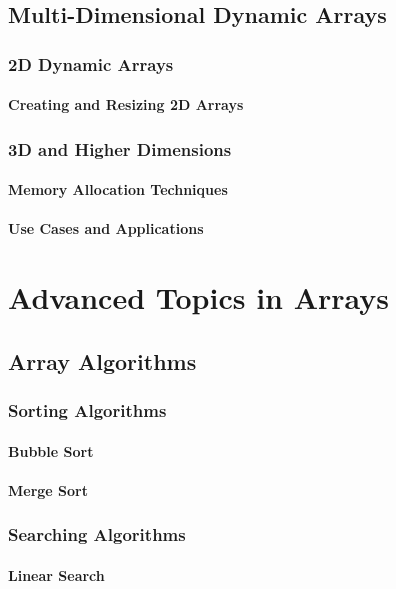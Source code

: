 \documentclass[12pt, oneside]{book}
\begin{document}
	\section{Multi-Dimensional Dynamic Arrays}
	\subsection{2D Dynamic Arrays}
	\subsubsection{Creating and Resizing 2D Arrays}
	\subsection{3D and Higher Dimensions}
	\subsubsection{Memory Allocation Techniques}
	\subsubsection{Use Cases and Applications}
	
\chapter{Advanced Topics in Arrays}

	\section{Array Algorithms}
	\subsection{Sorting Algorithms}
	\subsubsection{Bubble Sort}
	\subsubsection{Merge Sort}
	\subsection{Searching Algorithms}
	\subsubsection{Linear Search}
\end{document}

